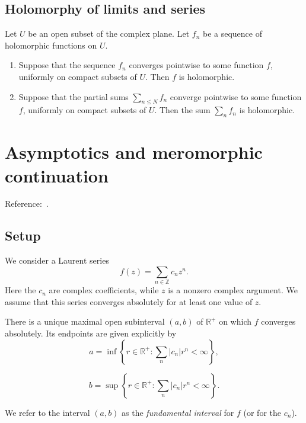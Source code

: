 \documentclass[reqno]{amsart}  \numberwithin{theorem}{section} \numberwithin{equation}{section}
\begin{document}
\subsection{Holomorphy of limits and series}
\begin{theorem}\label{theorem:cj3vqa91ti}
  Let $U$ be an open subset of the complex plane.  Let $f_n$ be a sequence of holomorphic functions on $U$.
  \begin{enumerate}
  \item Suppose that the sequence $f_n$ converges pointwise to some function $f$, uniformly on compact subsets of $U$.  Then $f$ is holomorphic.
  \item Suppose that the partial sums $\sum_{n \leq N} f_n$ converge pointwise to some function $f$, uniformly on compact subsets of $U$.  Then the sum $\sum_n f_n$ is holomorphic.
  \end{enumerate}
\end{theorem}

\newpage
\section{Asymptotics and meromorphic continuation}
Reference:~\cite[\S5.2]{MR2172781}.

\subsection{Setup}
We consider a Laurent series
\begin{equation*}
  f (z) = \sum_{n \in \mathbb{Z} } c_n z^n.
\end{equation*}
Here the $c_n$ are complex coefficients, while $z$ is a nonzero complex argument.  We assume that this series converges absolutely for at least one value of $z$.

\begin{lemma}\label{lemma:cj3vqafpa6}
  There is a unique maximal open subinterval $(a,b)$ of $\mathbb{R}^+$ on which $f$ converges absolutely.  Its endpoints are given explicitly by
  \begin{equation*}
    a = \inf \left\{ r \in \mathbb{R}^+ : \sum_n \lvert c_n \rvert r^n < \infty  \right\},
  \end{equation*}

\begin{equation*}
  b = \sup \left\{ r \in \mathbb{R}^+ : \sum_n \lvert c_n \rvert r^n < \infty  \right\}.
\end{equation*}
\end{lemma}
We refer to the interval $(a,b)$ as the \emph{fundamental interval} for $f$ (or for the $c_n$).
\end{document}

